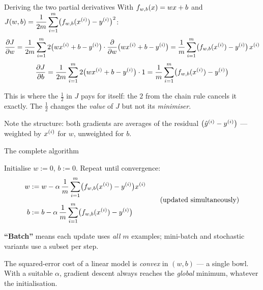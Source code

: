 \documentclass[aspectratio=169,11pt]{beamer}
\begin{document}
\begin{frame}{Deriving the two partial derivatives}
  \small
  With $f_{w,b}(x)=wx+b$ and $J(w,b)=\dfrac{1}{2m}\displaystyle\sum_{i=1}^{m}\bigl(f_{w,b}(x^{(i)})-y^{(i)}\bigr)^2$:
  \vspace{1mm}
  \[
    \frac{\partial J}{\partial w}
    = \frac{1}{2m}\sum_{i=1}^{m} 2\bigl(wx^{(i)}+b-y^{(i)}\bigr)\cdot \frac{\partial}{\partial w}\bigl(wx^{(i)}+b-y^{(i)}\bigr)
    = \frac{1}{m}\sum_{i=1}^{m}\bigl(f_{w,b}(x^{(i)})-y^{(i)}\bigr)\,x^{(i)}
  \]
  \[
    \frac{\partial J}{\partial b}
    = \frac{1}{2m}\sum_{i=1}^{m} 2\bigl(wx^{(i)}+b-y^{(i)}\bigr)\cdot 1
    = \frac{1}{m}\sum_{i=1}^{m}\bigl(f_{w,b}(x^{(i)})-y^{(i)}\bigr)
  \]
  \vspace{1mm}
  \begin{keyidea}
    This is where the $\tfrac{1}{2}$ in $J$ pays for itself: the $2$ from the
    chain rule cancels it exactly. The $\tfrac12$ changes the \emph{value} of $J$
    but not its \emph{minimiser}.
  \end{keyidea}
  \vspace{1mm}
  Note the structure: both gradients are averages of the residual
  $\bigl(\hat{y}^{(i)}-y^{(i)}\bigr)$ --- weighted by $x^{(i)}$ for $w$, unweighted for $b$.
\end{frame}

\begin{frame}{The complete algorithm}
  \begin{defnbox}
    Initialise $w:=0$, $b:=0$. Repeat until convergence:
    \[
      \begin{aligned}
        w &:= w - \alpha\,\frac{1}{m}\sum_{i=1}^{m}\bigl(f_{w,b}(x^{(i)})-y^{(i)}\bigr)x^{(i)}\\[3pt]
        b &:= b - \alpha\,\frac{1}{m}\sum_{i=1}^{m}\bigl(f_{w,b}(x^{(i)})-y^{(i)}\bigr)
      \end{aligned}
      \qquad\text{(updated simultaneously)}
    \]
  \end{defnbox}
  \small
  \textbf{``Batch''} means each update uses \emph{all $m$} examples; mini-batch
  and stochastic variants use a subset per step.
  \begin{keyidea}
    \footnotesize The squared-error cost of a linear model is \emph{convex} in
    $(w,b)$ --- a single bowl. With a suitable $\alpha$, gradient descent
    always reaches the \emph{global} minimum, whatever the initialisation.
  \end{keyidea}
\end{frame}
\end{document}
